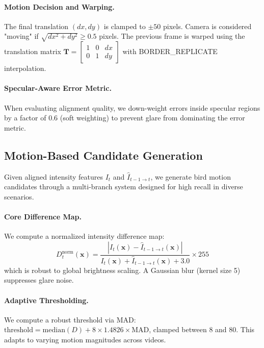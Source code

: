 \paragraph{Motion Decision and Warping.}
The final translation $(dx, dy)$ is clamped to $\pm 50$ pixels. Camera is considered "moving" if $\sqrt{dx^2 + dy^2} \geq 0.5$ pixels. The previous frame is warped using the translation matrix $\mathbf{T} = \begin{bmatrix} 1 & 0 & dx \\ 0 & 1 & dy \end{bmatrix}$ with BORDER\_REPLICATE interpolation.

\paragraph{Specular-Aware Error Metric.}
When evaluating alignment quality, we down-weight errors inside specular regions by a factor of 0.6 (soft weighting) to prevent glare from dominating the error metric.

\subsection{Motion-Based Candidate Generation}
\label{sec:candidate_gen}

Given aligned intensity features $I_t$ and $\hat{I}_{t-1 \rightarrow t}$, we generate bird motion candidates through a multi-branch system designed for high recall in diverse scenarios.

\paragraph{Core Difference Map.}
We compute a normalized intensity difference map:
\[
D^{\text{norm}}_t(\mathbf{x}) = \frac{|I_t(\mathbf{x}) - \hat{I}_{t-1 \rightarrow t}(\mathbf{x})|}{I_t(\mathbf{x}) + \hat{I}_{t-1 \rightarrow t}(\mathbf{x}) + 3.0} \times 255
\]
which is robust to global brightness scaling. A Gaussian blur (kernel size 5) suppresses glare noise.

\paragraph{Adaptive Thresholding.}
We compute a robust threshold via MAD: $\text{threshold} = \text{median}(D) + 8 \times 1.4826 \times \text{MAD}$, clamped between 8 and 80. This adapts to varying motion magnitudes across videos.

